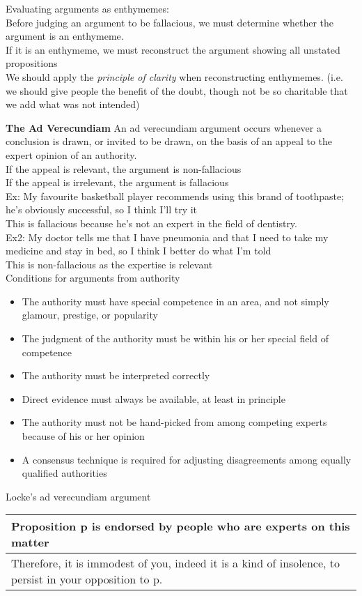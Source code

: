 Evaluating arguments as enthymemes:\\
Before judging an argument to be fallacious, we must determine whether the argument is an enthymeme.\\
If it is an enthymeme, we must reconstruct the argument showing all unstated propositions\\
We should apply the \textit{principle of clarity} when reconstructing enthymemes. (i.e. we should give people the benefit of the doubt, though not be so charitable that we add what was not intended)

\textbf{The Ad Verecundiam}
An ad verecundiam argument occurs whenever a conclusion is drawn, or invited to be drawn, on the basis of an appeal to the expert opinion of an authority.\\
If the appeal is relevant, the argument is non-fallacious\\
If the appeal is irrelevant, the argument is fallacious\\

Ex: My favourite basketball player recommends using this brand of toothpaste; he's obviously successful, so I think I'll try it\\

This is fallacious because he's not an expert in the field of dentistry.\\

Ex2: My doctor tells me that I have pneumonia and that I need to take my medicine and stay in bed, so I think I better do what I'm told\\

This is non-fallacious as the expertise is relevant\\

Conditions for arguments from authority\\
\begin{itemize}
    \item The authority must have special competence in an area, and not simply glamour, prestige, or popularity
    \item The judgment of the authority must be within his or her special field of competence
    \item The authority must be interpreted correctly
    \item Direct evidence must always be available, at least in principle
    \item The authority must not be hand-picked from among competing experts because of his or her opinion
    \item A consensus technique is required for adjusting disagreements among equally qualified authorities
\end{itemize}
Locke's ad verecundiam argument\\
\begin{tabular}{p{16cm}}
    Proposition p is endorsed by people who are experts on this matter\\
    \hline
    Therefore, it is immodest of you, indeed it is a kind of insolence, to persist in your opposition to p.
\end{tabular}\\


